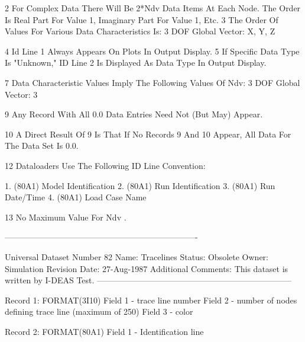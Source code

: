 \documentclass[10pt,openany,twoside]{book}
\numberwithin{equation}{section}   %
\begin{document}
\begin{example}
          2        For Complex Data There Will Be 2*Ndv Data Items At Each
                      Node. The Order Is Real Part For Value 1,  Imaginary
                      Part For Value 1, Etc.
          3        The Order Of Values For Various Data  Characteristics
                      Is:
                          3 DOF Global Vector:
                                  X, Y, Z

          4        Id Line 1 Always Appears On Plots In Output Display.
          5        If Specific Data Type Is "Unknown," ID Line 2 Is
                      Displayed As Data Type In Output Display.

          7        Data Characteristic Values Imply The Following Values
                      Of Ndv:
                                      3 DOF Global Vector: 3

          9        Any Record With All 0.0 Data Entries Need Not (But
                      May) Appear.

          10       A Direct Result Of 9 Is That If No Records 9 And 10
                      Appear, All Data For The Data Set Is 0.0.

          12       Dataloaders Use The Following ID Line Convention:

                              1.   (80A1) Model
                                  Identification
                              2.   (80A1) Run
                                  Identification
                              3.   (80A1) Run
                                  Date/Time
                              4.   (80A1) Load Case
                                  Name

          13       No Maximum Value For Ndv .

----------------------------------------------------------------------

Universal Dataset Number 82
Name:   Tracelines
Status: Obsolete
Owner:  Simulation
Revision Date: 27-Aug-1987
Additional Comments:  This dataset is written by I-DEAS Test.
-----------------------------------------------------------------------

             Record 1: FORMAT(3I10)
                       Field 1 -    trace line number
                       Field 2 -    number of nodes defining trace line
                                    (maximum of 250)
                       Field 3 -    color

             Record 2: FORMAT(80A1)
                       Field 1 -    Identification line


\end{example}
\end{document}
